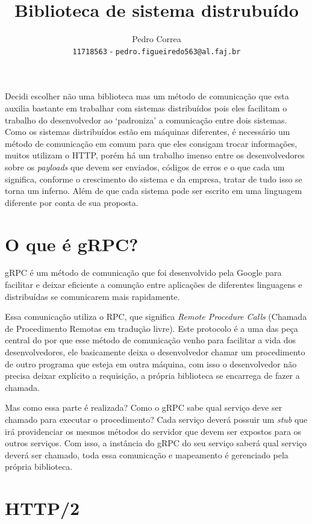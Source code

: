 \documentclass[a4paper, 12pt]{article}
\author{
  Pedro Correa\\
  \texttt{11718563} - \texttt{pedro.figueiredo563@al.faj.br}
}
\title{Biblioteca de sistema distrubuído}
\begin{document}
\maketitle

\newpage

Decidi escolher não uma biblioteca mas um método de comunicação que esta auxilia bastante em trabalhar com sistemas distribuídos pois eles facilitam o trabalho do desenvolvedor ao `padroniza' a comunicação entre dois sistemas.
Como os sistemas distribuídos estão em máquinas diferentes, é necessário um método de comunicação em comum para que eles consigam trocar informações,
muitos utilizam o HTTP, porém há um trabalho imenso entre os desenvolvedores sobre os \emph{payloads} que devem ser enviados, códigos de erros e o que cada um significa,
conforme o crescimento do sistema e da empresa, tratar de tudo isso se torna um inferno.
Além de que cada sistema pode ser escrito em uma linguagem diferente por conta de sua proposta.

\section{O que é gRPC?}

gRPC é um método de comunicação que foi desenvolvido pela Google para facilitar e deixar eficiente a comunção entre aplicações de diferentes linguagens e distribuídas se comunicarem mais rapidamente.

Essa comunicação utiliza o RPC, que significa \emph{Remote Procedure Calls} (Chamada de Procedimento Remotas em tradução livre).
Este protocolo é a uma das peça central do por que esse método de comunicação venho para facilitar a vida dos desenvolvedores,
ele basicamente deixa o desenvolvedor chamar um procedimento de outro programa que esteja em outra máquina,
com isso o desenvolvedor não precisa deixar explícito a requisição, a própria biblioteca se encarrega de fazer a chamada.

Mas como essa parte é realizada? Como o gRPC sabe qual serviço deve ser chamado para executar o procedimento?
Cada serviço deverá possuir um \emph{stub} que irá providenciar os mesmos métodos do servidor que devem ser expostos para os outros serviços.
Com isso, a instância do gRPC do seu serviço saberá qual serviço deverá ser chamado,
toda essa comunicação e mapeamento é gerenciado pela própria biblioteca.

\section{HTTP/2}
\end{document}
